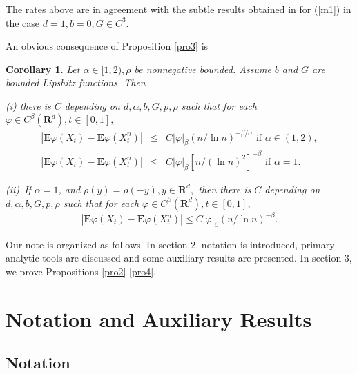 \documentclass[11pt]{amsart}
\theoremstyle{plain}
\newtheorem{corollary}{Corollary}
\numberwithin{equation}{section}
\begin{document}
The rates above are in agreement with the subtle results obtained in \cite{j}
for (\ref{m1}) in the case $d=1,b=0,G\in C^{3}$.

An obvious consequence of Proposition \ref{pro3} is

\begin{corollary}
\label{cl1}Let $\alpha \in \lbrack 1,2),\rho $ be nonnegative bounded.
Assume $b$ and $G$ are bounded Lipshitz functions. Then

(i) there is $C$ depending on $d,\alpha ,b,G,p,\rho $ such that for each $\varphi \in C^{\beta }\left( \mathbf{R}^{d}\right) ,t\in \left[ 0,1\right] ,$\begin{eqnarray*}
\left\vert \mathbf{E}\varphi \left( X_{t}\right) -\mathbf{E}\varphi \left(
X_{t}^{n}\right) \right\vert &\leq &C\left\vert \varphi \right\vert _{\beta
}\left( n/\ln n\right) ^{-\beta /\alpha }\text{ if }\alpha \in \left(
1,2\right) , \\
\left\vert \mathbf{E}\varphi \left( X_{t}\right) -\mathbf{E}\varphi \left(
X_{t}^{n}\right) \right\vert &\leq &C\left\vert \varphi \right\vert _{\beta }\left[ n/(\ln n)^{2}\right] ^{-\beta }\text{ if }\alpha =1.
\end{eqnarray*}

(ii)\ If $\alpha =1$, and $\rho \left( y\right) =\rho \left( -y\right) ,y\in 
\mathbf{R}^{d},$ then there is $C$ depending on $d,\alpha ,b,G,p,\rho $ such
that for each $\varphi \in C^{\beta }\left( \mathbf{R}^{d}\right) ,t\in \left[ 0,1\right] ,$\begin{equation*}
\left\vert \mathbf{E}\varphi \left( X_{t}\right) -\mathbf{E}\varphi \left(
X_{t}^{n}\right) \right\vert \leq C\left\vert \varphi \right\vert _{\beta
}\left( n/\ln n\right) ^{-\beta }.
\end{equation*}
\end{corollary}

Our note is organized as follows. In section 2, notation is introduced,
primary analytic tools are discussed and some auxiliary results are
presented. In section 3, we prove Propositions \ref{pro2}-\ref{pro4}.

\section{Notation and Auxiliary Results}

\subsection{Notation}
\end{document}
